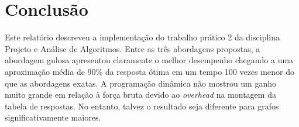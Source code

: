 \documentclass{article}
\begin{document}
\section{Conclusão}

Este relatório descreveu a implementação do trabalho prático 2 da disciplina Projeto e Análise de Algoritmos. Entre as três abordagens
propostas, a abordagem gulosa apresentou claramente o melhor desempenho chegando a uma aproximação média de 90\% da resposta ótima
em um tempo 100 vezes menor do que as abordagens exatas. A programação dinâmica não mostrou um ganho muito grande em relação à força
bruta devido ao \textit{overhead} na montagem da tabela de respostas. No entanto, talvez o resultado seja diferente para grafos 
significativamente maiores.
\end{document}
